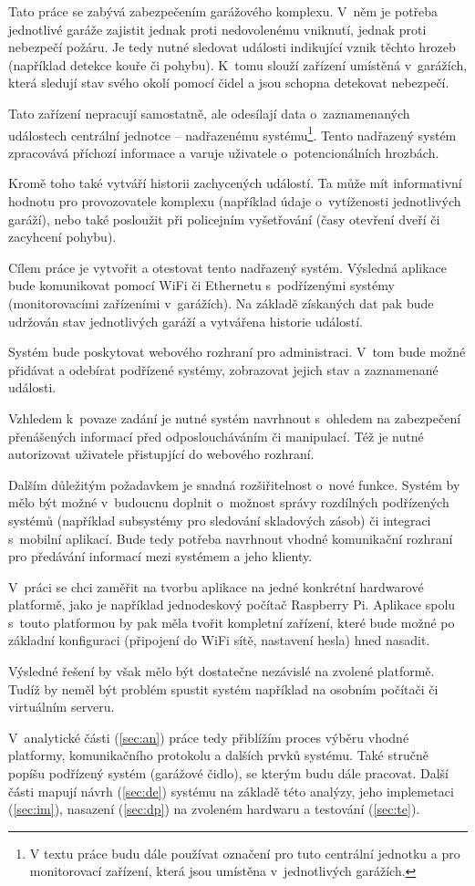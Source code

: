 Tato práce se zabývá zabezpečením garážového komplexu. V~něm je potřeba jednotlivé garáže zajistit jednak proti nedovolenému vniknutí, jednak proti nebezpečí požáru. Je tedy nutné sledovat události indikující vznik těchto hrozeb (například detekce kouře či pohybu). K~tomu slouží zařízení umístěná v~garážích, která sledují stav svého okolí pomocí čidel a jsou schopna detekovat nebezpečí. 

Tato zařízení nepracují samostatně, ale odesílají data o~zaznamenaných událostech centrální jednotce -- nadřazenému systému\footnote{V textu práce budu dále používat označení  pro tuto centrální jednotku a  pro monitorovací zařízení, která jsou umístěna v~jednotlivých garážích.}. Tento nadřazený systém zpracovává příchozí informace a varuje uživatele o~potencionálních hrozbách.

Kromě toho také vytváří historii zachycených událostí. Ta může mít informativní hodnotu pro provozovatele komplexu (například údaje o~vytíženosti jednotlivých garáží), nebo také posloužit při policejním vyšetřování (časy otevření dveří či zacyhcení pohybu).

Cílem práce je vytvořit a otestovat tento nadřazený systém. Výsledná aplikace bude komunikovat pomocí WiFi či Ethernetu s~podřízenými systémy (monitorovacími zařízeními v~garážích). Na základě získaných dat pak bude udržován stav jednotlivých garáží a vytvářena historie událostí.

Systém bude poskytovat webového rozhraní pro administraci. V~tom bude možné přidávat a odebírat podřízené systémy, zobrazovat jejich stav a zaznamenané události.

Vzhledem k~povaze zadání je nutné systém navrhnout s~ohledem na zabezpečení přenášených informací před odposloucháváním či manipulací. Též je nutné autorizovat uživatele přistupjící do webového rozhraní.

Dalším důležitým požadavkem je snadná rozšiřitelnost o~nové funkce. Systém by mělo být možné v~budoucnu doplnit o~možnost správy rozdílných podřízených systémů (například subsystémy pro sledování skladových zásob) či integraci s~mobilní aplikací. Bude tedy potřeba navrhnout vhodné komunikační rozhraní pro předávání informací mezi systémem a jeho klienty. 

V~práci se chci zaměřit na tvorbu aplikace na jedné konkrétní hardwarové platformě, jako je například jednodeskový počítač Raspberry Pi. Aplikace spolu s~touto platformou by pak měla tvořit kompletní zařízení, které bude možné po základní konfiguraci (připojení do WiFi sítě, nastavení hesla) hned nasadit.

Výsledné řešení by však mělo být dostatečne nezávislé na zvolené platformě. Tudíž by neměl být problém spustit systém například na osobním počítači či virtuálním serveru.

V~analytické části (\ref{sec:an}) práce tedy přiblížím proces výběru vhodné platformy, komunikačního protokolu a dalších prvků systému. Také stručně popíšu podřízený systém (garážové čidlo), se kterým budu dále pracovat. Další části mapují návrh (\ref{sec:de}) systému na základě této analýzy, jeho implemetaci (\ref{sec:im}), nasazení (\ref{sec:dp}) na zvoleném hardwaru a testování (\ref{sec:te}).